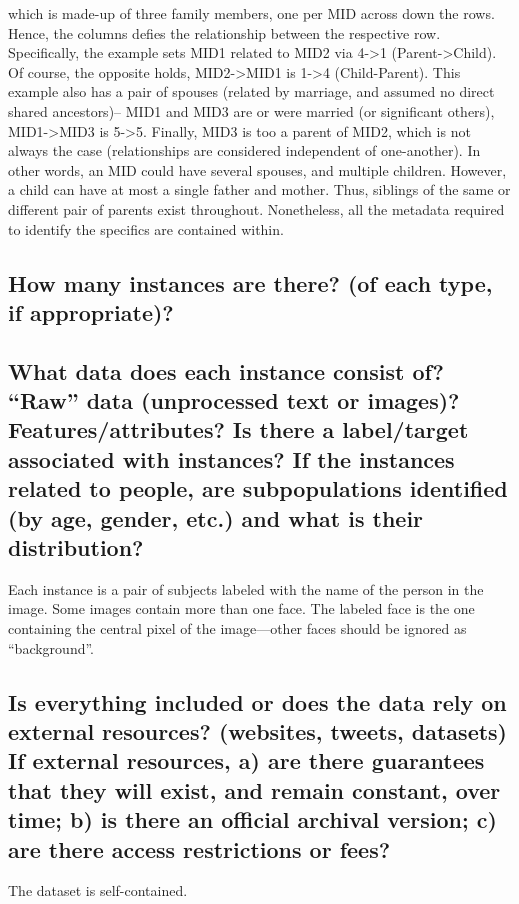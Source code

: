 which is made-up of three family members, one per MID across down the rows. Hence, the columns defies the relationship between the respective row. Specifically, the example sets MID1 related to MID2 via 4->1 (Parent->Child). Of course, the opposite holds, \ie MID2->MID1 is 1->4 (Child-Parent). This example also has a pair of spouses (\ie related by marriage, and assumed no direct shared ancestors)-- MID1 and MID3 are or were married (or significant others), \ie MID1->MID3 is 5->5. Finally, MID3 is too a parent of MID2, which is not always the case (\ie relationships are considered independent of one-another). In other words, an MID could have several spouses, and multiple children. However, a child can have at most a single father and mother. Thus, siblings of the same or different pair of parents exist throughout. Nonetheless, all the metadata required to identify the specifics are contained within.



\subsection*{How many instances are there? (of each type, if appropriate)?}
\noindent

\subsection*{What data does each instance consist of? “Raw” data (\eg unprocessed text or images)? Features/attributes? Is there a label/target associated with instances? If the instances related to people, are subpopulations identified (\eg by age, gender, etc.) and what is their distribution?}
\noindent Each instance is a pair of subjects labeled with the name of the
person in the image. Some images contain more than one face.
The labeled face is the one containing the central pixel of the
image—other faces should be ignored as “background”.

\subsection*{Is everything included or does the data rely on external resources?
(\eg websites, tweets, datasets) If external resources, a) are there guarantees that they will exist, and remain constant, over time; b) is there an official archival version; c) are there access restrictions or fees?}
\noindent The dataset is self-contained.


